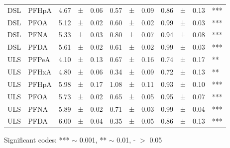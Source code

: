 \begin{table}
{\begin{threeparttable}
\begin{tabular}{llllllllllll}
DSL                                  & PFHpA                     & 4.67        & ±        & 0.06        & 0.57      & ±      & 0.09      & 0.86       & ±       & 0.13               & ***          \\
DSL                                  & PFOA                      & 5.12        & ±        & 0.02        & 0.60      & ±      & 0.02      & 0.99       & ±       & 0.03               & ***          \\
DSL                                  & PFNA                      & 5.33        & ±        & 0.03        & 0.80      & ±      & 0.07      & 0.94       & ±       & 0.08               & ***          \\
DSL                                  & PFDA                      & 5.61        & ±        & 0.02        & 0.61      & ±      & 0.02      & 0.99       & ±       & 0.03               & ***          \\
ULS                                  & PFPeA                     & 4.10        & ±        & 0.13        & 0.67      & ±      & 0.16      & 0.74       & ±       & 0.17               & **           \\
ULS                                  & PFHxA                     & 4.80        & ±        & 0.06        & 0.34      & ±      & 0.09      & 0.72       & ±       & 0.13               & **           \\
ULS                                  & PFHpA                     & 5.98        & ±        & 0.17        & 1.08      & ±      & 0.11      & 0.93       & ±       & 0.10               & ***          \\
ULS                                  & PFOA                      & 5.73        & ±        & 0.02        & 0.65      & ±      & 0.05      & 0.95       & ±       & 0.07               & ***          \\
ULS                                  & PFNA                      & 5.89        & ±        & 0.02        & 0.71      & ±      & 0.03      & 0.99       & ±       & 0.04               & ***          \\
ULS                                  & PFDA                      & 6.00        & ±        & 0.04        & 0.35      & ±      & 0.05      & 0.86       & ±       & 0.13               & ***     \\ \bottomrule    
\end{tabular}
\begin{tablenotes}
\item Significant codes: *** $\sim$ 0.001, ** $\sim$ 0.01, - $>$ 0.05 
\end{tablenotes}
\end{threeparttable}}
\end{table}

